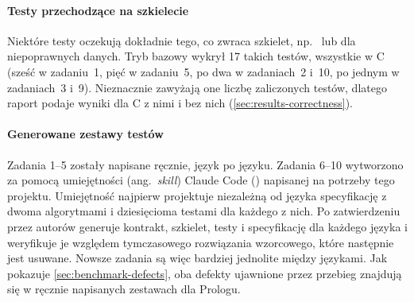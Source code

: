 \paragraph{Testy przechodzące na szkielecie} Niektóre testy oczekują dokładnie tego, co zwraca
szkielet, np.\  lub  dla niepoprawnych danych. Tryb bazowy wykrył 17 takich
testów, wszystkie w C (sześć w zadaniu~1, pięć w zadaniu~5, po dwa w zadaniach~2 i~10, po jednym
w zadaniach~3 i~9). Nieznacznie zawyżają one liczbę zaliczonych testów, dlatego raport podaje wyniki
dla C z nimi i bez nich (\cref{sec:results-correctness}).

\paragraph{Generowane zestawy testów} Zadania 1--5 zostały napisane ręcznie, język po języku.
Zadania 6--10 wytworzono za pomocą umiejętności (ang.~\emph{skill}) Claude Code
() napisanej na potrzeby tego projektu. Umiejętność najpierw projektuje
niezależną od języka specyfikację z dwoma algorytmami i dziesięcioma testami dla każdego z nich.
Po zatwierdzeniu przez autorów generuje kontrakt, szkielet, testy i specyfikację dla każdego języka
i weryfikuje je względem tymczasowego rozwiązania wzorcowego, które następnie jest usuwane. Nowsze
zadania są więc bardziej jednolite między językami. Jak pokazuje \cref{sec:benchmark-defects}, oba
defekty ujawnione przez przebieg znajdują się w ręcznie napisanych zestawach dla Prologu.
